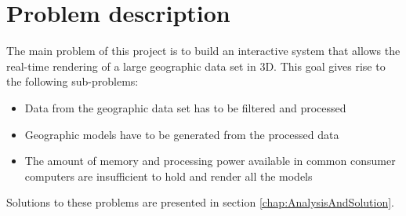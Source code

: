 \chapter{Problem description}
\label{chapter:ProblemDescription}
The main problem of this project is to build an interactive system that allows the real-time rendering of a large geographic data set in 3D. This goal gives rise to the following sub-problems:
\begin{itemize}
   \item Data from the geographic data set has to be filtered and processed
   \item Geographic models have to be generated from the processed data
   \item The amount of memory and processing power available in common consumer computers are insufficient to hold and render all the models
\end{itemize}
Solutions to these problems are presented in section \ref{chap:AnalysisAndSolution}. 